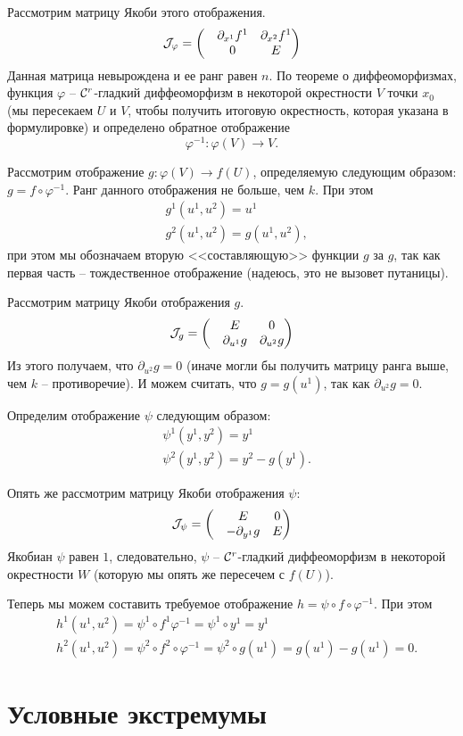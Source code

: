 \begin{Proof}
		Рассмотрим матрицу Якоби этого отображения.
		$$
			\mathcal{J}_{\varphi} = \begin{pmatrix}
				&\partial_{x^1} f^1 &\partial_{x^2} f^1\\
				&0 & E
			\end{pmatrix}
		$$
		Данная матрица невырождена и ее ранг равен $n$. По теореме о диффеоморфизмах, функция $\varphi$ -- $\mathcal{C}^r$-гладкий диффеоморфизм в некоторой окрестности $V$ точки $x_0$ (мы пересекаем $U$ и $V$, чтобы получить итоговую окрестность, которая указана в формулировке) и определено обратное отображение 
		$$\varphi^{-1}\colon \varphi(V) \to V.$$
		
		Рассмотрим отображение $g\colon \varphi(V) \to f(U)$, определяемую следующим образом: $g= f \circ \varphi^{-1}$. Ранг данного отображения не больше, чем $k$.
		При этом
		\begin{align*}
		&g^1(u^1, u^2) = u^1\\
		&g^2(u^1, u^2) = g(u^1, u^2),
		\end{align*} при этом мы обозначаем вторую <<составляющую>> функции $g$ за $g$, так как первая часть -- тождественное отображение (надеюсь, это не вызовет путаницы).
		
		Рассмотрим матрицу Якоби отображения $g$.
		$$
			\mathcal{J}_g = \begin{pmatrix}
				& E & 0\\
				& \partial_{u^1} g & \partial_{u^2} g
			\end{pmatrix}
		$$
		Из этого получаем, что $\partial_{u^2} g = 0$ (иначе могли бы получить матрицу ранга выше, чем $k$ -- противоречие). И можем считать, что $g = g(u^1)$, так как $\partial_{u^2} g = 0$.
		
		Определим отображение $\psi$ следующим образом:
		\begin{align*}
			&\psi^1(y^1, y^2) = y^1\\
			&\psi^2(y^1, y^2) = y^2 - g(y^1).
		\end{align*}
		
		Опять же рассмотрим матрицу Якоби отображения $\psi$:
		$$
			\mathcal{J}_{\psi} = \begin{pmatrix}
				& E & 0\\
				&-\partial_{y^1} g & E
			\end{pmatrix}
		$$
		Якобиан $\psi$ равен $1$, следовательно, $\psi$ -- $\mathcal{C}^r$-гладкий диффеоморфизм в некоторой окрестности $W$ (которую мы опять же пересечем с $f(U)$).
		
		Теперь мы можем составить требуемое отображение $h = \psi \circ f \circ \varphi^{-1}$. При этом
		\begin{align*}
		&h^1(u^1, u^2) = \psi^1 \circ f^1 \varphi^{-1} = \psi^1 \circ y^1 = y^1\\
		&h^2(u^1, u^2) = \psi^2 \circ f^2 \circ \varphi^{-1} = \psi^2 \circ g(u^1) = g(u^1) - g(u^1) = 0.
		\end{align*}
	\end{Proof}
	
	\section{Условные экстремумы} 